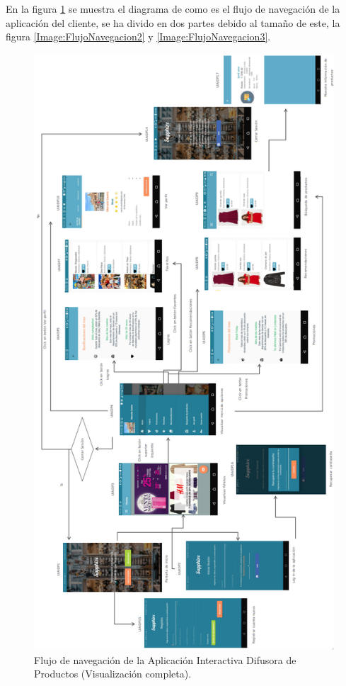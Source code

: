 En la figura \ref{Image:FlujoNavegacion1} se muestra el diagrama de como es el flujo de navegación de la aplicación del cliente, se ha divido en dos partes debido al tamaño de este, la figura \ref{Image:FlujoNavegacion2} y \ref{Image:FlujoNavegacion3}.
\FloatBarrier
\begin{figure}[htbp!]
		\centering
			\includegraphics[width=.66 \textwidth]{imagenes/UI_userapp/mapaNav1H}
		\caption{Flujo de navegación de la Aplicación Interactiva Difusora de Productos (Visualización completa).}
		\label{Image:FlujoNavegacion1}
\end{figure}
\FloatBarrier

